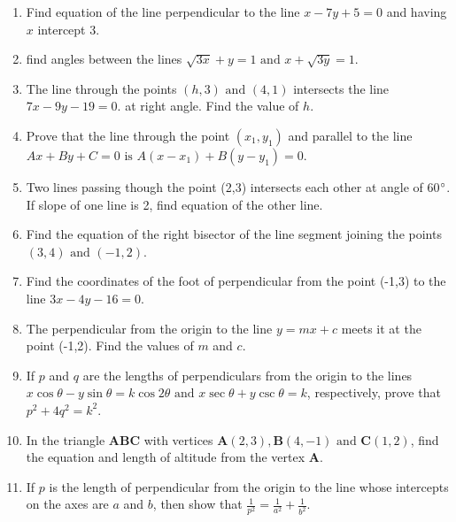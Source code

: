 \documentclass[12pt]{article}
\let\vec\mathbf
\begin{document}
\begin{enumerate}
\item Find equation of the line perpendicular to the line $x-7y+5=0$ and having $x$ intercept 3.
\item find angles between the lines $\sqrt{3x}+y=1 \text{ and }x+\sqrt{3y}=1$.
\item The line through the points $(h,3)\text{ and }(4,1)$ intersects the line $7x-9y-19=0$. at right angle. Find the value of $h$.
\item Prove that the line through the point $(x_1,y_1)$ and parallel to the line $ Ax+By+C=0 \text{ is } A(x-x_1)+B(y-y_1)=0$.
\item Two lines passing though the point (2,3) intersects each other at angle of 60$\degree$. If slope of one line is 2, find equation of the other line.
\item Find the equation of the right bisector of the line segment joining the points $(3,4)\text{ and }(-1,2)$.
\item Find the coordinates of the foot of perpendicular from the point (-1,3) to the line $3x-4y-16=0$.
\item The perpendicular from the origin to the line $y=mx+c$ meets it at the point (-1,2). Find the values of $m$ and $c$.
\item If $p$ and $q$ are the lengths of perpendiculars from the origin to the lines $x\cos{\theta}-y\sin{\theta}=k\cos{2\theta}\text{ and } x\sec{\theta}+y\csc{\theta}=k $, respectively, prove that $p^2+4q^2=k^2$.
\item In the triangle $\vec{ABC}$ with vertices $\vec{A}(2,3),\vec{B}(4,-1)\text{ and }\vec{C}(1,2)$, find the equation and length of altitude from the vertex $\vec{A}$.
\item If $p$ is the length of perpendicular from the origin to the line whose intercepts on the axes are $a$ and $b$, then show that $\frac{1}{p^2}=\frac{1}{a^2}+\frac{1}{b^2}$.
\end{enumerate}
\end{document}
